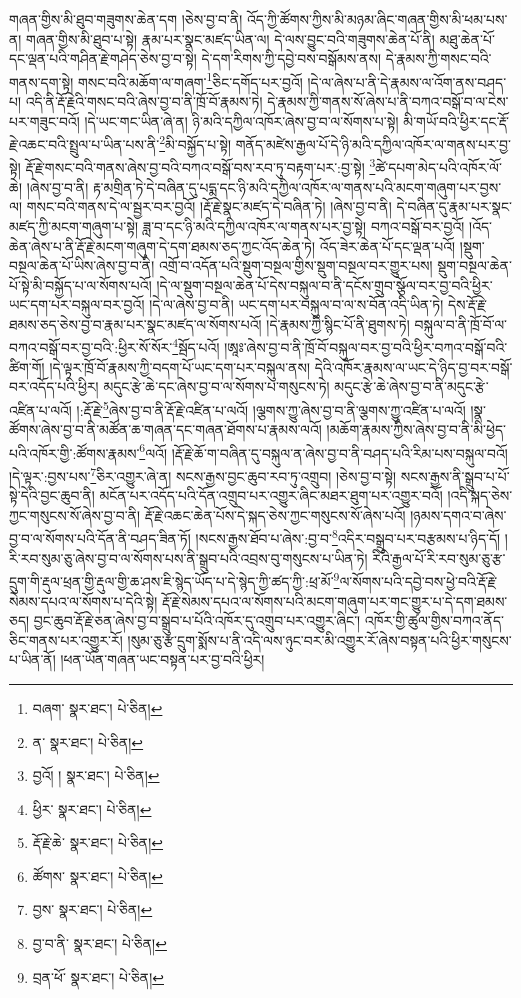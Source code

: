 གཞན་གྱིས་མི་ཐུབ་གཟུགས་ཆེན་དག །ཅེས་བྱ་བ་ནི། འོད་ཀྱི་ཚོགས་ཀྱིས་མི་མཉམ་ཞིང་གཞན་གྱིས་མི་ཕམ་པས་ན། གཞན་གྱིས་མི་ཐུབ་པ་སྟེ། རྣམ་པར་སྣང་མཛད་ཡིན་ལ། དེ་ལས་བྱུང་བའི་གཟུགས་ཆེན་པོ་ནི། མཐུ་ཆེན་པོ་དང་ལྡན་པའི་གཤིན་རྗེ་གཤེད་ཅེས་བྱ་བ་སྟེ། དེ་དག་རིགས་ཀྱི་དབྱེ་བས་བསྒོམས་ནས། དེ་རྣམས་ཀྱི་གསང་བའི་གནས་དག་སྟེ། གསང་བའི་མཆོག་ལ་གཞག་\footnote{བཞག་  སྣར་ཐང་།  པེ་ཅིན། }ཅིང་དགོད་པར་བྱའོ། །དེ་ལ་ཞེས་པ་ནི་དེ་རྣམས་ལ་འོག་ནས་བཤད་པ། འདི་ནི་རྡོ་རྗེའི་གསང་བའི་ཞེས་བྱ་བ་ནི་ཁྲོ་བོ་རྣམས་ཏེ། དེ་རྣམས་ཀྱི་གནས་སོ་ཞེས་པ་ནི་བཀའ་བསྒོ་བ་ལ་ངེས་པར་གཟུང་བའོ། །དེ་ཡང་གང་ཡིན་ཞེ་ན། ཉི་མའི་དཀྱིལ་འཁོར་ཞེས་བྱ་བ་ལ་སོགས་པ་སྟེ། མི་གཡོ་བའི་ཕྱིར་དང་རྡོ་རྗེ་འཆང་བའི་སྤྲུལ་པ་ཡིན་པས་ནི་\footnote{ན་  སྣར་ཐང་།  པེ་ཅིན། }མི་བསྐྱོད་པ་སྟེ། གནོད་མཛེས་རྒྱལ་པོ་དེ་ཉི་མའི་དཀྱིལ་འཁོར་ལ་གནས་པར་བྱ་སྟེ། རྡོ་རྗེ་གསང་བའི་གནས་ཞེས་བྱ་བའི་བཀའ་བསྒོ་བས་རབ་ཏུ་བརྟག་པར་:བྱ་སྟེ། \footnote{བྱའོ། །   སྣར་ཐང་།  པེ་ཅིན། }ཚེ་དཔག་མེད་པའི་འཁོར་ལོ་ཆེ། །ཞེས་བྱ་བ་ནི། རྟ་མགྲིན་ཏེ་དེ་བཞིན་དུ་པདྨ་དང་ཉི་མའི་དཀྱིལ་འཁོར་ལ་གནས་པའི་མངག་གཞུག་པར་བྱས་ལ། གསང་བའི་གནས་དེ་ལ་སྦྱར་བར་བྱའོ། །རྡོ་རྗེ་སྣང་མཛད་དེ་བཞིན་ཏེ། །ཞེས་བྱ་བ་ནི། དེ་བཞིན་དུ་རྣམ་པར་སྣང་མཛད་ཀྱི་མངག་གཞུག་པ་སྟེ། ཟླ་བ་དང་ཉི་མའི་དཀྱིལ་འཁོར་ལ་གནས་པར་བྱ་སྟེ། བཀའ་བསྒོ་བར་བྱའོ། །འོད་ཆེན་ཞེས་པ་ནི་རྡོ་རྗེ་མངག་གཞུག་དེ་དག་ཐམས་ཅད་ཀྱང་འོད་ཆེན་ཏེ། འོད་ཟེར་ཆེན་པོ་དང་ལྡན་པའོ། །སྡུག་བསྔལ་ཆེན་པོ་ཡིས་ཞེས་བྱ་བ་ནི། འགྲོ་བ་འདོན་པའི་སྡུག་བསྔལ་གྱིས་སྡུག་བསྔལ་བར་གྱུར་པས། སྡུག་བསྔལ་ཆེན་པོ་སྟེ་མི་བསྐྱོད་པ་ལ་སོགས་པའོ། །དེ་ལ་སྡུག་བསྔལ་ཆེན་པོ་དེས་བསྐུལ་བ་ནི་དངོས་གྲུབ་སྩོལ་བར་བྱ་བའི་ཕྱིར་ཡང་དག་པར་བསྐུལ་བར་བྱའོ། །དེ་ལ་ཞེས་བྱ་བ་ནི། ཡང་དག་པར་བསྐུལ་བ་ལ་ས་བོན་འདི་ཡིན་ཏེ། དེས་རྡོ་རྗེ་ཐམས་ཅད་ཅེས་བྱ་བ་རྣམ་པར་སྣང་མཛད་ལ་སོགས་པའོ། །དེ་རྣམས་ཀྱི་སྙིང་པོ་ནི་ཐུགས་ཏེ། བསྐུལ་བ་ནི་ཁྲོ་བོ་ལ་བཀའ་བསྒོ་བར་བྱ་བའི་:ཕྱིར་སོ་སོར་\footnote{ཕྱིར་  སྣར་ཐང་།  པེ་ཅིན། }སྦོད་པའོ། །ཨཱཿ་ཞེས་བྱ་བ་ནི་ཁྲོ་བོ་བསྐུལ་བར་བྱ་བའི་ཕྱིར་བཀའ་བསྒོ་བའི་ཚིག་གོ། །དེ་ལྟར་ཁྲོ་བོ་རྣམས་ཀྱི་བདག་པོ་ཡང་དག་པར་བསྐུལ་ནས། དེའི་འཁོར་རྣམས་ལ་ཡང་དེ་ཉིད་བྱ་བར་བསྒོ་བར་འདོད་པའི་ཕྱིར། མདུང་རྩེ་ཆེ་དང་ཞེས་བྱ་བ་ལ་སོགས་པ་གསུངས་ཏེ། མདུང་རྩེ་ཆེ་ཞེས་བྱ་བ་ནི་མདུང་རྩེ་འཛིན་པ་ལའོ། །:རྡོ་རྗེ་\footnote{རྡོ་རྗེ་ཆེ་  སྣར་ཐང་།  པེ་ཅིན། }ཞེས་བྱ་བ་ནི་རྡོ་རྗེ་འཛིན་པ་ལའོ། །ལྕགས་ཀྱུ་ཞེས་བྱ་བ་ནི་ལྕགས་ཀྱུ་འཛིན་པ་ལའོ། །སྣ་ཚོགས་ཞེས་བྱ་བ་ནི་མཚོན་ཆ་གཞན་དང་གཞན་ཐོགས་པ་རྣམས་ལའོ། །མཆོག་རྣམས་ཀྱིས་ཞེས་བྱ་བ་ནི་མི་ཕྱེད་པའི་འཁོར་གྱི་:ཚོགས་རྣམས་\footnote{ཚོགས་  སྣར་ཐང་།  པེ་ཅིན། }ལའོ། །རྡོ་རྗེ་ཆོ་ག་བཞིན་དུ་བསྐུལ་ན་ཞེས་བྱ་བ་ནི་བཤད་པའི་རིམ་པས་བསྐུལ་བའོ། །དེ་ལྟར་:བྱས་པས་\footnote{བྱས་  སྣར་ཐང་།  པེ་ཅིན། }ཅིར་འགྱུར་ཞེ་ན། སངས་རྒྱས་བྱང་ཆུབ་རབ་ཏུ་འགྲུབ། །ཅེས་བྱ་བ་སྟེ། སངས་རྒྱས་ནི་སྒྲུབ་པ་པོ་སྟེ་དེའི་བྱང་ཆུབ་ནི། མངོན་པར་འདོད་པའི་དོན་འགྲུབ་པར་འགྱུར་ཞིང་མཐར་ཐུག་པར་འགྱུར་བའོ། །འདི་སྐད་ཅེས་ཀྱང་གསུངས་སོ་ཞེས་བྱ་བ་ནི། རྡོ་རྗེ་འཆང་ཆེན་པོས་དེ་སྐད་ཅེས་ཀྱང་གསུངས་སོ་ཞེས་པའོ། །ཉམས་དགའ་བ་ཞེས་བྱ་བ་ལ་སོགས་པའི་དོན་ནི་བཤད་ཟིན་ཏོ། །སངས་རྒྱས་ཐོབ་པ་ཞེས་:བྱ་བ་\footnote{བྱ་བ་ནི་  སྣར་ཐང་།  པེ་ཅིན། }འདིར་བསྒྲུབ་པར་བརྩམས་པ་ཉིད་དོ། །རི་རབ་སུམ་ཅུ་ཞེས་བྱ་བ་ལ་སོགས་པས་ནི་སྒྲུབ་པའི་འབྲས་བུ་གསུངས་པ་ཡིན་ཏེ། རིའི་རྒྱལ་པོ་རི་རབ་སུམ་ཅུ་རྩ་དྲུག་གི་རྡུལ་ཕྲན་གྱི་རྡུལ་གྱི་ཆ་ཤས་ཇི་སྙེད་ཡོད་པ་དེ་སྙེད་ཀྱི་ཚད་ཀྱི་:ཕྲ་མོ་\footnote{བྲན་ཕོ་  སྣར་ཐང་།  པེ་ཅིན། }ལ་སོགས་པའི་དབྱེ་བས་ཕྱེ་བའི་རྡོ་རྗེ་སེམས་དཔའ་ལ་སོགས་པ་དེའི་སྟེ། རྡོ་རྗེ་སེམས་དཔའ་ལ་སོགས་པའི་མངག་གཞུག་པར་གང་གྱུར་པ་དེ་དག་ཐམས་ཅད། བྱང་ཆུབ་རྡོ་རྗེ་ཅན་ཞེས་བྱ་བ་སྒྲུབ་པ་པོའི་འཁོར་དུ་འགྲུབ་པར་འགྱུར་ཞིང་། འཁོར་གྱི་ཚུལ་གྱིས་བཀའ་ནོད་ཅིང་གནས་པར་འགྱུར་རོ། །སུམ་ཅུ་རྩ་དྲུག་སྨོས་པ་ནི་འདི་ལས་ཉུང་བར་མི་འགྱུར་རོ་ཞེས་བསྟན་པའི་ཕྱིར་གསུངས་པ་ཡིན་ནོ། །ཕན་ཡོན་གཞན་ཡང་བསྟན་པར་བྱ་བའི་ཕྱིར། 